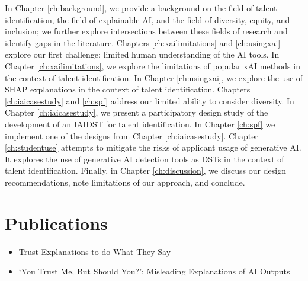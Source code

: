 In Chapter \ref{ch:background}, we provide a background on the field of talent identification, the field of explainable AI, and the field of diversity, equity, and inclusion; we further explore intersections between these fields of research and identify gaps in the literature. Chapters \ref{ch:xailimitations} and \ref{ch:usingxai} explore our first challenge: limited human understanding of the AI tools. In Chapter \ref{ch:xailimitations}, we explore the limitations of popular xAI methods in the context of talent identification. In Chapter \ref{ch:usingxai}, we explore the use of SHAP explanations in the context of talent identification. Chapters \ref{ch:iaicasestudy} and \ref{ch:spf}  address our limited ability to consider diversity. In Chapter \ref{ch:iaicasestudy}, we present a participatory design study of the development of an IAIDST for talent identification. In Chapter \ref{ch:spf} we implement one of the designs from Chapter \ref{ch:iaicasestudy}. Chapter \ref{ch:studentuse} attempts to mitigate the risks of applicant usage of generative AI. It explores the use of generative AI detection tools as DSTs in the context of talent identification. Finally, in Chapter \ref{ch:discussion}, we discuss our design recommendations, note limitations of our approach, and conclude.

\section{Publications}

\begin{itemize}
    \item \textcite{natarajan_trust_2023} Trust Explanations to do What They Say
    \item \textcite{...} `You Trust Me, But Should You?': Misleading Explanations of AI Outputs
\end{itemize}